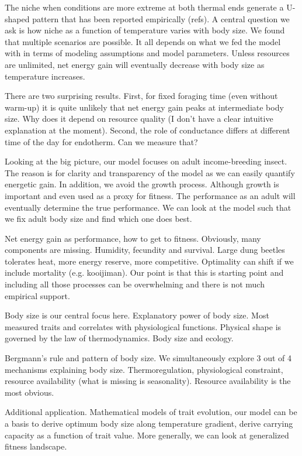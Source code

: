 The niche when conditions are more extreme at both thermal ends generate a U-shaped pattern that has been reported empirically (refs).
A central question we ask is how  niche as a function of temperature varies with body size.
We found that multiple scenarios are possible.
It all depends on what we fed the model with in terms of modeling assumptions and model parameters.
Unless resources are unlimited, net energy gain will eventually decrease with body size as temperature increases.

There are two surprising results.
First, for fixed foraging time (even without warm-up) it is quite unlikely that net energy gain peaks at intermediate body size.
Why does it depend on resource quality (I don't have a clear intuitive explanation at the moment).
Second, the role of conductance differs at different time of the day for endotherm.
Can we measure that?  

Looking at the big picture, our model focuses on adult income-breeding insect.
The reason is for clarity and transparency of the model as we can easily quantify energetic gain.
In addition, we avoid the growth process.
Although growth is important and even used as a proxy for fitness.
The performance as an adult will eventually determine the true performance.
We can look at the model such that we fix adult body size and find which one does best. 

Net energy gain as performance, how to get to fitness.
Obviously, many components are missing.
Humidity, fecundity and survival.
Large dung beetles tolerates heat, more energy reserve, more competitive.
Optimality can shift if we include mortality (e.g. kooijiman).
Our point is that this is starting point and including all those processes can be overwhelming and there is not much empirical support.

Body size is our central focus here.
Explanatory power of body size.
Most measured traits and correlates with physiological functions.
Physical shape is governed by the law of thermodynamics.
Body size and ecology.

Bergmann's rule and pattern of body size.
We simultaneously explore 3 out of 4 mechanisms explaining body size.
Thermoregulation, physiological constraint, resource availability (what is missing is seasonality).
Resource availability is the most obvious.

Additional application.
Mathematical models of trait evolution, our model can be a basis to derive optimum body size along temperature gradient, derive carrying capacity as a function of trait value. 
More generally, we can look at generalized fitness landscape.

